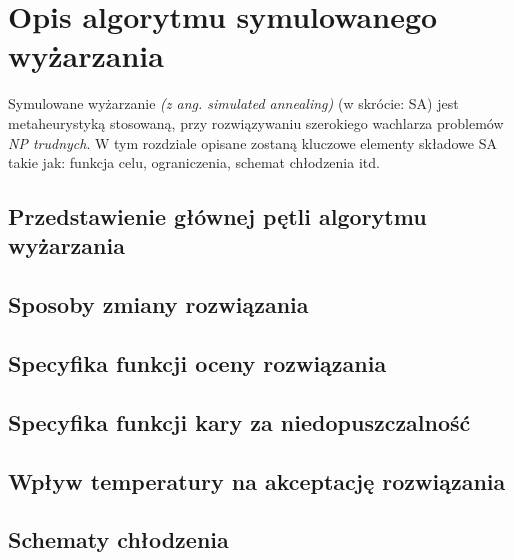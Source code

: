 \chapter{Opis algorytmu symulowanego wyżarzania} \label{chapter:sa-desc}
Symulowane wyżarzanie \cite{metaheuristic-handbook} \emph{(z ang. simulated annealing)} (w skrócie: SA) jest metaheurystyką stosowaną, przy rozwiązywaniu szerokiego wachlarza problemów \emph{NP trudnych}. W tym rozdziale opisane zostaną kluczowe elementy składowe SA takie jak: funkcja celu, ograniczenia, schemat chłodzenia itd.

\section{Przedstawienie głównej pętli algorytmu wyżarzania}
\section{Sposoby zmiany rozwiązania}
\section{Specyfika funkcji oceny rozwiązania}
\section{Specyfika funkcji kary za niedopuszczalność}
\section{Wpływ temperatury na akceptację rozwiązania}
\section{Schematy chłodzenia}
